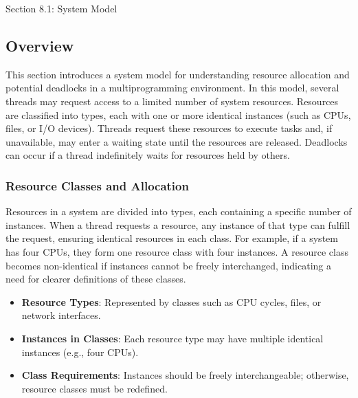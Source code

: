 \begin{notes}{Section 8.1: System Model}
    \subsection*{Overview}

    This section introduces a system model for understanding resource allocation and potential deadlocks in a multiprogramming environment. In this model, several threads may request access to a 
    limited number of system resources. Resources are classified into types, each with one or more identical instances (such as CPUs, files, or I/O devices). Threads request these resources to 
    execute tasks and, if unavailable, may enter a waiting state until the resources are released. Deadlocks can occur if a thread indefinitely waits for resources held by others.
    
    \subsubsection*{Resource Classes and Allocation}
    
    Resources in a system are divided into types, each containing a specific number of instances. When a thread requests a resource, any instance of that type can fulfill the request, ensuring 
    identical resources in each class. For example, if a system has four CPUs, they form one resource class with four instances. A resource class becomes non-identical if instances cannot be 
    freely interchanged, indicating a need for clearer definitions of these classes.
    
    \begin{highlight}
    
        \begin{itemize}
            \item \textbf{Resource Types}: Represented by classes such as CPU cycles, files, or network interfaces.
            \item \textbf{Instances in Classes}: Each resource type may have multiple identical instances (e.g., four CPUs).
            \item \textbf{Class Requirements}: Instances should be freely interchangeable; otherwise, resource classes must be redefined.
        \end{itemize}
    
    \end{highlight}
    

\end{notes}
